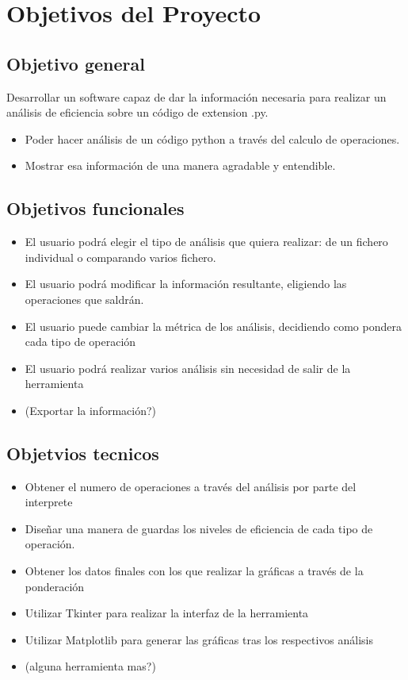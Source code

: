
\section{Objetivos del Proyecto}

\subsection{Objetivo general}


Desarrollar un software capaz de dar la información necesaria para realizar un análisis de eficiencia sobre un código de extension .py.
\begin{itemize}
	\item Poder hacer análisis de un código python a través del calculo de operaciones.
	\item Mostrar esa información de una manera agradable y entendible.
\end{itemize}


\subsection{Objetivos funcionales}
	\begin{itemize}
	\item El usuario podrá elegir el tipo de análisis que quiera realizar: de un fichero individual o comparando varios fichero.
	\item El usuario podrá modificar la información resultante, eligiendo las operaciones que saldrán.
	\item El usuario puede cambiar la métrica de los análisis, decidiendo como pondera cada tipo de operación
	\item El usuario podrá realizar varios análisis sin necesidad de salir de la herramienta
	\item(Exportar la información?)
\end{itemize}


\subsection{Objetvios tecnicos}
	\begin{itemize}
	\item Obtener el numero de operaciones a través del análisis por parte del interprete
	\item Diseñar una manera de guardas los niveles de eficiencia de cada tipo de operación.
	\item Obtener los datos finales con los que realizar la  gráficas a través de la ponderación
	\item Utilizar Tkinter para realizar la interfaz de la herramienta
	\item Utilizar Matplotlib  para generar las gráficas tras los respectivos análisis
	\item (alguna herramienta mas?)
\end{itemize}
